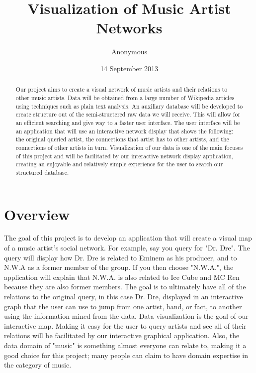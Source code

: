 \documentclass{sig-alternate}
\begin{document}
\title{Visualization of Music Artist Networks }
\author{
\alignauthor
Anonymous
}


\date{14 September 2013}
\maketitle
\begin {abstract}
Our project aims to create a visual network of music artists 
and their relations to other music artists. Data will be obtained 
from a large number of Wikipedia articles using techniques such 
as plain text analysis. An auxiliary database will be developed to 
create structure out of the semi-structered raw data we will receive. 
This will allow for an efficient searching and give way to a faster user interface. 
The user interface will be an application that will use an interactive network 
display that shows the following: the original queried artist, the 
connections that artist has to other artists, and the connections 
of other artists in turn. Visualization of our data is one of 
the main focuses of this project and will be facilitated by our
 interactive network display application, creating an enjoyable and relatively 
simple experience for the user to search our structured database.

\end{abstract}

\section{Overview}
\label{overview}
The goal of this project is to develop an application that will create 
a visual map of a music artist's social network. For example, say you query 
for "Dr. Dre". The query will display how Dr. Dre is related to Eminem as 
his producer, and to N.W.A as a former member of the group. If you then 
choose "N.W.A.", the application will explain that N.W.A. is also related to 
 Ice Cube and MC Ren because they are also former members. The goal is 
to ultimately have all of the relations to the original query, in this case Dr. Dre, 
displayed in an interactive graph that the user can use to jump from one 
artist, band, or fact, to another using the information mined from the data. 
Data visualization is the goal of our interactive map. Making it easy 
for the user to query artists and see all of their relations will 
be facilitated by our interactive graphical application. Also, the data domain 
of "music" is something almost everyone can relate to, making it 
a good choice for this project; many people can claim to have domain 
expertise in the category of music.
\end{document}
